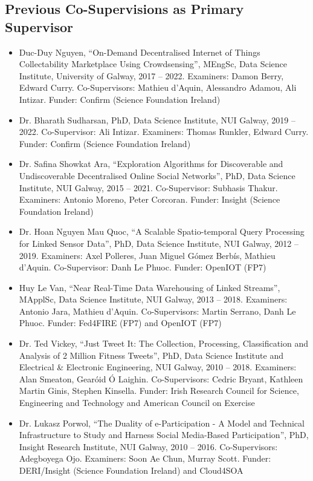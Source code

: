 \documentclass[10pt,a4paper]{res} %
\begin{document}
\begin{resume}
\subsection*{Previous Co-Supervisions as Primary Supervisor}

\begin{itemize} \itemsep -2pt
\item Duc-Duy Nguyen, ``On-Demand Decentralised Internet of Things Collectability Marketplace Using Crowdsensing'', MEngSc, Data Science Institute, University of Galway, 2017 -- 2022. Examiners: Damon Berry, Edward Curry. Co-Supervisors: Mathieu d'Aquin, Alessandro Adamou, Ali Intizar. Funder: Confirm (Science Foundation Ireland)
\item Dr. Bharath Sudharsan, PhD, Data Science Institute, NUI Galway, 2019 -- 2022. Co-Supervisor: Ali Intizar. Examiners: Thomas Runkler, Edward Curry. Funder: Confirm (Science Foundation Ireland) %
\item Dr. Safina Showkat Ara, ``Exploration Algorithms for Discoverable and Undiscoverable Decentralised Online Social Networks'', PhD, Data Science Institute, NUI Galway, 2015 -- 2021. Co-Supervisor: Subhasis Thakur. Examiners: Antonio Moreno, Peter Corcoran. Funder: Insight (Science Foundation Ireland) %
\item Dr. Hoan Nguyen Mau Quoc, ``A Scalable Spatio-temporal Query Processing for Linked Sensor Data'', PhD, Data Science Institute, NUI Galway, 2012 -- 2019. Examiners: Axel Polleres, Juan Miguel G\'{o}mez Berb\'{i}s, Mathieu d'Aquin. Co-Supervisor: Danh Le Phuoc. Funder: OpenIOT (FP7) %
\item Huy Le Van, ``Near Real-Time Data Warehousing of Linked Streams'', MApplSc, Data Science Institute, NUI Galway, 2013 -- 2018. Examiners: Antonio Jara, Mathieu d'Aquin. Co-Supervisors: Martin Serrano, Danh Le Phuoc. Funder: Fed4FIRE (FP7) and OpenIOT (FP7)
\item Dr. Ted Vickey, ``Just Tweet It: The Collection, Processing, Classification and Analysis of 2 Million Fitness Tweets'', PhD, Data Science Institute and Electrical \& Electronic Engineering, NUI Galway, 2010 -- 2018. Examiners: Alan Smeaton, Gear\'{o}id \'{O} Laighin. Co-Supervisors: Cedric Bryant, Kathleen Martin Ginis, Stephen Kinsella. Funder: Irish Research Council for Science, Engineering and Technology and American Council on Exercise %
\item Dr. Lukasz Porwol, ``The Duality of e-Participation - A Model and Technical Infrastructure to Study and Harness Social Media-Based Participation'', PhD, Insight Research Institute, NUI Galway, 2010 -- 2016. Co-Supervisors: Adegboyega Ojo. Examiners: Soon Ae Chun, Murray Scott. Funder: DERI/Insight (Science Foundation Ireland) and Cloud4SOA

\end{itemize}
\end{resume}
\end{document}
